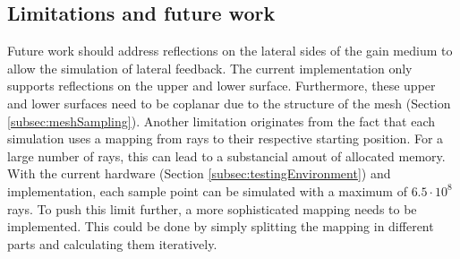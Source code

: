 \subsection{Limitations and future work}
\label{subsec:limitations}
Future work should address reflections on the lateral sides of the gain medium
to allow the simulation of lateral feedback. The current implementation only
supports reflections on the upper and lower surface. Furthermore, these upper
and lower surfaces need to be coplanar due to the structure of the mesh
(Section \ref{subsec:meshSampling}).
Another limitation originates from the fact that each simulation uses a mapping
from rays to their respective starting position. For a large number of rays,
this can lead to a substancial amout of allocated memory. With the current
hardware (Section \ref{subsec:testingEnvironment}) and implementation, each sample
point can be simulated with a maximum of $6.5\cdot10^8$ rays. To push this limit
further, a more sophisticated mapping needs to be implemented. This could
be done by simply splitting the mapping in different parts and calculating them
iteratively.
